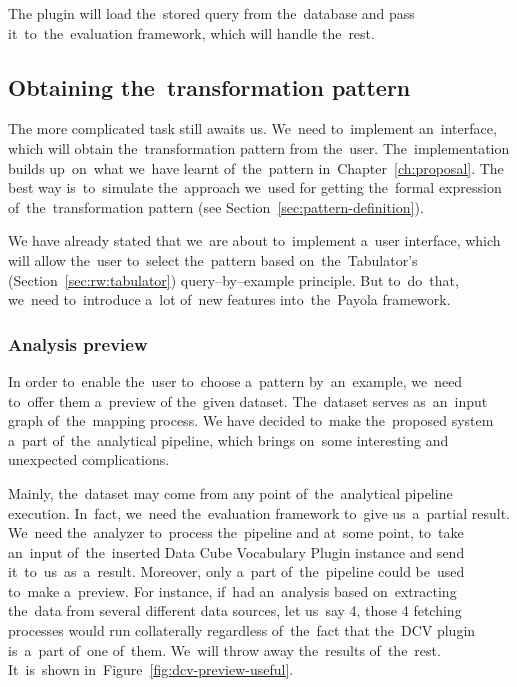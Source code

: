 The plugin will load the~stored query from the~database and pass it~to~the~evaluation framework, which will handle the~rest.

\subsection{Obtaining the~transformation pattern}
The more complicated task still awaits us. We~need to~implement an~interface, 
which will obtain the~transformation pattern from the~user. The~implementation 
builds up~on~what we~have learnt of~the~pattern in~Chapter~\ref{ch:proposal}.
The best way is~to~simulate the~approach we~used for getting the~formal expression of~the~transformation pattern
(see Section~\ref{sec:pattern-definition}).

We have already stated that we~are about to~implement a~user interface, which 
will allow the~user to~select the~pattern based on~the~Tabulator's (Section~\ref{sec:rw:tabulator})
query--by--example principle. But to~do~that, we~need to~introduce a~lot of~new 
features into~the~Payola framework.

\subsubsection{Analysis preview}
In order to~enable the~user to~choose a~pattern by~an~example, we~need to~offer them a~preview
of the~given dataset. The~dataset serves as~an~input graph of~the~mapping process. 
We have decided to~make the~proposed system a~part of~the~analytical 
pipeline, which brings on~some interesting and unexpected complications.

Mainly, the~dataset may come from any point of~the~analytical pipeline execution. In~fact, we~need the~evaluation framework to~give us~a~partial result. We~need the~analyzer to~process the~pipeline and at~some point, to~take an~input of~the~inserted Data Cube Vocabulary Plugin instance and send it~to~us~as~a~result. 
Moreover, only a~part of~the~pipeline could be~used to~make a~preview. For instance, if~had an~analysis
based on~extracting the~data from several different data sources, 
let us~say 4, those 4 fetching processes would run collaterally regardless of~the~fact that the~DCV plugin is~a~part of~one of~them. We~will throw away the~results of~the~rest. It~is~shown in~Figure~\ref{fig:dcv-preview-useful}.

